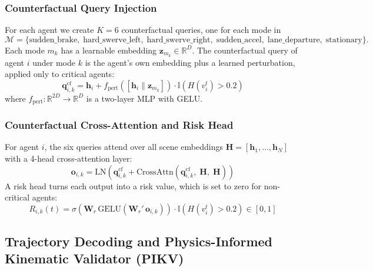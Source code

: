 \documentclass[preprint,12pt]{elsarticle}
\begin{document}
\subsubsection{Counterfactual Query Injection}
For each agent we create $K = 6$ counterfactual queries, one for each mode in
\begin{equation}
    \mathcal{M} = \{\text{sudden\_brake}, \; \text{hard\_swerve\_left}, \; \text{hard\_swerve\_right}, \; \text{sudden\_accel}, \; \text{lane\_departure}, \; \text{stationary}\}.
    \label{eq_modes}
\end{equation}
Each mode $m_k$ has a learnable embedding $\mathbf{z}_{m_k} \in \mathbb{R}^D$. The counterfactual query of agent $i$ under mode $k$ is the agent's own embedding plus a learned perturbation, applied only to critical agents:
\begin{equation}
    \mathbf{q}_{i,k}^{\text{cf}} = \mathbf{h}_i + f_{\text{pert}}\left(\left[\mathbf{h}_i \| \mathbf{z}_{m_k}\right]\right) \cdot \mathbb{I}\left(H(v_i^t) > 0.2\right)
    \label{eq_cf_query}
\end{equation}
where $f_{\text{pert}}: \mathbb{R}^{2D} \to \mathbb{R}^D$ is a two-layer MLP with GELU.

\subsubsection{Counterfactual Cross-Attention and Risk Head}
For agent $i$, the six queries attend over all scene embeddings $\mathbf{H} = [\mathbf{h}_1, \dots, \mathbf{h}_N]$ with a 4-head cross-attention layer:
\begin{equation}
    \mathbf{o}_{i,k} = \text{LN}\left(\mathbf{q}_{i,k}^{\text{cf}} + \text{CrossAttn}\left(\mathbf{q}_{i,k}^{\text{cf}}, \; \mathbf{H}, \; \mathbf{H}\right)\right)
    \label{eq_cf_attn}
\end{equation}
A risk head turns each output into a risk value, which is set to zero for non-critical agents:
\begin{equation}
    R_{i,k}(t) = \sigma\left(\mathbf{W}_r \, \text{GELU}\left(\mathbf{W}_r' \, \mathbf{o}_{i,k}\right)\right) \cdot \mathbb{I}\left(H(v_i^t) > 0.2\right) \in [0, 1]
    \label{eq_risk_logit}
\end{equation}

\subsection{Trajectory Decoding and Physics-Informed Kinematic Validator (PIKV)}
\end{document}
